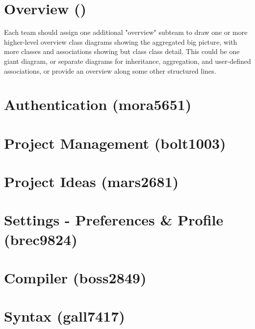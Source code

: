 \documentclass[11pt]{report}
\begin{document}
\section{Overview ()}
Each team should assign one additional "overview" subteam to draw one or more higher-level overview class diagrams showing the aggregated big picture, with more classes and associations showing but class class detail. This could be one giant diagram, or separate diagrams for inheritance, aggregation, and user-defined associations, or provide an overview along some other structured lines.



\section{Authentication (mora5651)}



\section{Project Management (bolt1003)}



\section{Project Ideas (mars2681)}



\section{Settings - Preferences \& Profile (brec9824)}



\section{Compiler (boss2849)}



\section{Syntax (gall7417)}
\end{document}
